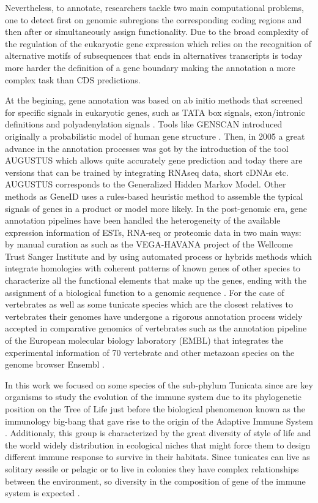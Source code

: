 \documentclass[11pt]{article}
\begin{document}
Nevertheless, to annotate, researchers tackle two main computational problems, 
one to detect first on genomic subregions the corresponding coding regions and 
then after or simultaneously assign functionality. Due to the broad complexity 
of the regulation of the eukaryotic gene expression which relies on 
the recognition of alternative motifs of subsequences that ends in alternatives 
transcripts is today more harder the definition of a gene boundary making the 
annotation a more complex task than CDS predictions\cite{yandell2012}. 

At the begining, gene annotation was based on ab initio methods that screened 
for  specific signals  in eukaryotic genes, such as TATA box signals, 
exon/intronic definitions and polyadenylation signals \cite{claverie}. Tools 
like GENSCAN introduced originally a probabilistic model of human gene structure 
\cite{genescan}. Then, in 2005 a great advance in the annotation processes was 
got by the introduction of the tool AUGUSTUS \cite{augustus} which allows quite 
accurately gene prediction and today there are versions that can be trained by 
integrating RNAseq data, short cDNAs etc. AUGUSTUS corresponds to the 
Generalized Hidden Markov Model. Other methods as GeneID \cite{Blanco:2007} uses 
a rules-based heuristic method to assemble the typical signals of genes in a 
product or model more likely. In the post-genomic era, gene annotation 
pipelines have been handled the heterogeneity of the available expression 
information of ESTs, RNA-seq or proteomic data in two main ways: by manual 
curation as such as the VEGA-HAVANA project of the Wellcome Trust Sanger 
Institute and by using automated process or hybrids methods which integrate 
homologies with coherent patterns of known genes of other species to 
characterize all the functional elements that make up the genes, ending with the 
assignment of a biological function to a genomic sequence \cite{aken2016ensembl} 
\cite{birney2004overview}. 
For the case of vertebrates as well as some tunicate species which are the 
closest relatives to vertebrates \cite{delsuc2006} their genomes have undergone 
a rigorous annotation process widely accepted in comparative genomics of 
vertebrates such as the annotation pipeline of the European molecular biology 
laboratory (EMBL) that integrates the experimental information of 70 vertebrate 
and other metazoan species on the genome browser Ensembl \cite{aken2016ensembl}.

In this work we focused on some species of the sub-phylum Tunicata since are 
key organisms to study the evolution of the immune system due to its 
phylogenetic position on the Tree of Life just before the biological phenomenon 
known as the immunology big-bang that gave rise to the origin of the Adaptive 
Immune System \cite{bernstein1996}. Additionaly, this group is characterized by 
the great diversity of style of life and the world widely distribution in 
ecological niches that might force them to design different immune response to 
survive in their habitats. Since tunicates can live as solitary sessile or 
pelagic or to live in colonies they have complex relationships between the 
environment, so diversity in the composition of gene of the immune system is 
expected  \cite{carroll2008evo, berna2014evolutionary}. 
\end{document}
